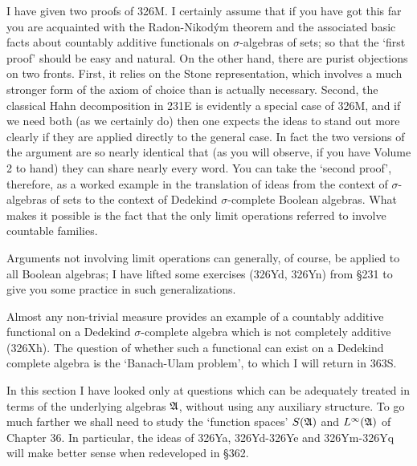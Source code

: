 {I have given two proofs of 326M.   I certainly assume
that if you have got this far you are acquainted with the
Radon-Nikod\'ym theorem and the associated basic facts about countably
additive functionals on $\sigma$-algebras of sets;  so that the `first
proof' should be easy and natural.   On the other hand, there are purist
objections on two fronts.   First, it relies on the Stone
representation, which involves a much stronger form of the axiom of
choice than is actually necessary.   Second, the classical Hahn
decomposition in 231E is evidently a special case of 326M, and if we
need both (as we certainly do) then one expects the ideas to stand out
more clearly if they are applied directly to the general case.   In fact
the two versions of the argument are so nearly identical that (as you
will observe, if you have Volume 2 to hand) they can share nearly every
word.   You can take the `second proof', therefore, as a worked example
in the translation of ideas from the context of $\sigma$-algebras of
sets to the context of Dedekind $\sigma$-complete Boolean algebras.
What makes it possible is the fact that the only limit operations
referred to involve countable families.

Arguments not involving limit operations can generally, of course, be
applied to all Boolean algebras;  I have lifted some exercises
(326Yd, 326Yn) from \S231 %
to give you some practice in such generalizations.

Almost any non-trivial measure provides an example of a countably
additive functional on a Dedekind $\sigma$-complete algebra which is not
completely additive (326Xh).   The question of whether such a functional
can exist on a Dedekind complete algebra is the `Banach-Ulam
problem', to which I will return in 363S.

In this section I have looked only at questions which can be adequately
treated in terms of the underlying algebras $\frak A$, without using any
auxiliary structure.   To go much farther we shall need to study the
`function spaces' $S(\frak A)$ and $L^{\infty}(\frak A)$ of Chapter 36.
In particular, the ideas of 326Ya, 326Yd-326Ye and
326Ym-326Yq %
will make better sense when redeveloped in \S362.
}%

\discrpage

